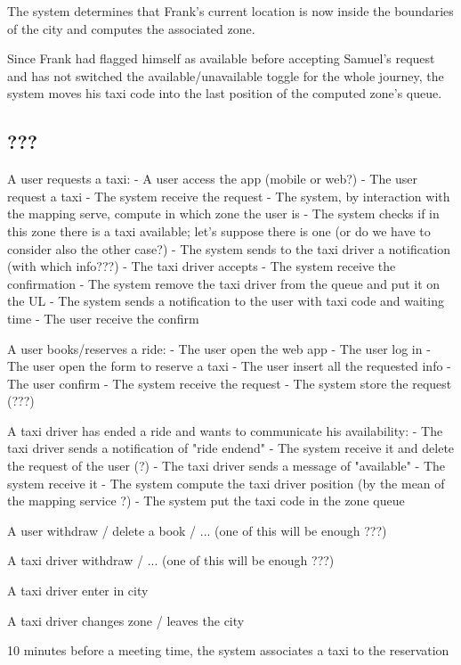 The system determines that Frank’s current location is now inside the boundaries of the city and computes the associated zone.

Since Frank had flagged himself as available before accepting Samuel’s request and has not switched the available/unavailable toggle for the whole journey, the system moves his taxi code into the last position of the computed zone’s queue. 


\subsection{???}
A user requests a taxi:
- A user access the app (mobile or web?)
- The user request a taxi
- The system receive the request
- The system, by interaction with the mapping serve, compute in which zone the user is
- The system checks if in this zone there is a taxi available; let's suppose there is one (or do we have to consider also the other case?)
- The system sends to the taxi driver a notification (with which info???)
- The taxi driver accepts
- The system receive the confirmation
- The system remove the taxi driver from the queue and put it on the UL
- The system sends a notification to the user with taxi code and waiting time
- The user receive the confirm

A user books/reserves a ride:
- The user open the web app
- The user log in
- The user open the form to reserve a taxi
- The user insert all the requested info
- The user confirm
- The system receive the request
- The system store the request (???)

A taxi driver has ended a ride and wants to communicate his availability:
- The taxi driver sends a notification of "ride endend"
- The system receive it and delete the request of the user (?)
- The taxi driver sends a message of "available"
- The system receive it
- The system compute the taxi driver position (by the mean of the mapping service ?)
- The system put the taxi code in the zone queue

A user withdraw / delete a book / ... (one of this will be enough ???)

A taxi driver withdraw / ... (one of this will be enough ???)

A taxi driver enter in city

A taxi driver changes zone / leaves the city

10 minutes before a meeting time, the system associates a taxi to the reservation